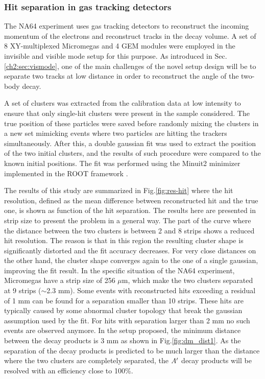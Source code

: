 \subsubsection{Hit separation in gas tracking detectors}
\label{ch5:sec:separ-hit-micr}

The NA64 experiment uses gas tracking detectors to reconstruct the incoming momentum of the electrons and reconstruct tracks in the decay volume. A set of 8 XY-multiplexed Micromegas and 4 GEM modules were employed in the invisible and visible mode setup for this purpose. As introduced in Sec.\ref{ch2:sec:vismode}, one of the main challenges of the novel setup design will be to separate two tracks at low distance in order to reconstruct the angle of the two-body decay.

A set of clusters was extracted from the calibration data at low intensity to ensure that only single-hit clusters were present in the sample considered. The true position of these particles were saved before randomly mixing the clusters in a new set mimicking events where two particles are hitting the trackers simultaneously. After this, a double gaussian fit was used to extract the position of the two initial clusters, and the results of such procedure were compared to the known initial positions. The fit was performed using the Minuit2 minimizer implemented in the ROOT framework \cite{root}.

The results of this study are summarized in Fig.\ref{fig:res-hit} where the hit resolution, defined as the mean difference between reconstructed hit and the true one, is shown as function of the hit separation. The results here are presented in strip size to present the problem in a general way. The part of the curve where the distance between the two clusters is between 2 and 8 strips shows a reduced hit resolution. The reason is that in this region the resulting cluster shape is significantly distorted and the fit accuracy decreases. For very close distances on the other hand, the cluster shape converges again to the one of a single gaussian, improving the fit result. In the specific situation of the NA64 experiment, Micromegas have a strip size of 256 $\mu$m, which make the two clusters separated at 9 strips ($\sim$2.3 mm). Some events with reconstructed hits exceeding a residual of 1 mm can be found for a separation smaller than 10 strips. These hits are typically caused by some abnormal cluster topology that break the gaussian assumption used by the fit. For hits with separation larger than 2 mm no such events are observed anymore. In the setup proposed, the minimum distance between the decay products is 3 mm as shown in Fig.\ref{fig:dm_dist1}. As the separation of the decay products is predicted to be much larger than the distance where the two clusters are completely separated, the $A'$ decay products will be resolved with an efficiency close to 100\%.

